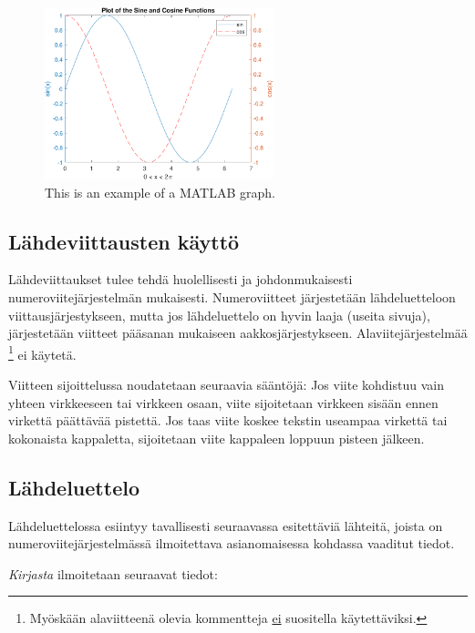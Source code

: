 \documentclass[english, 12pt, a4paper, elec, utf8, a-1b, online]{aaltothesis}
\begin{document}
\begin{figure}[htb]
\centering
\includegraphics[height=5cm]{curves.pdf}
\caption{This is an example of a MATLAB graph. \label{kuva2}}
\end{figure}


\subsection*{L\"ahdeviittausten k\"aytt\"o} 

L\"ahdeviittaukset tulee tehd\"a huolellisesti ja johdonmukaisesti
numeroviitej\"arjestelm\"an mukaisesti. Numeroviitteet j\"arjestet\"a\"an
l\"ahdeluetteloon viittausj\"arjestykseen, mutta jos l\"ahdeluettelo
on hyvin laaja (useita sivuja), j\"arjestet\"a\"an viitteet p\"a\"asanan 
mukaiseen aakkosj\"arjestykseen. Alaviitej\"arjestelm\"a\"a
\footnote{My\"osk\"a\"an alaviitteen\"a olevia kommentteja \underline{ei} suositella
k\"aytett\"aviksi.} ei k\"aytet\"a. 

Viitteen sijoittelussa noudatetaan seuraavia s\"a\"ant\"oj\"a:
Jos viite kohdistuu vain yhteen virkkeeseen tai virkkeen 
osaan, viite \cite{Kauranen} sijoitetaan virkkeen sis\"a\"an ennen virkett\"a
p\"a\"att\"av\"a\"a pistett\"a. Jos taas viite koskee tekstin useampaa
virkett\"a tai kokonaista kappaletta, sijoitetaan viite kappaleen loppuun 
pisteen j\"alkeen. \cite{Kauranen} 

\subsection*{L\"ahdeluettelo} 

L\"ahdeluettelossa esiintyy tavallisesti seuraavassa esitett\"avi\"a
l\"ahteit\"a, joista on numeroviitej\"arjestelm\"ass\"a ilmoitettava
asianomaisessa kohdassa vaaditut tiedot.

\textit{Kirjasta} ilmoitetaan seuraavat tiedot:
\end{document}
